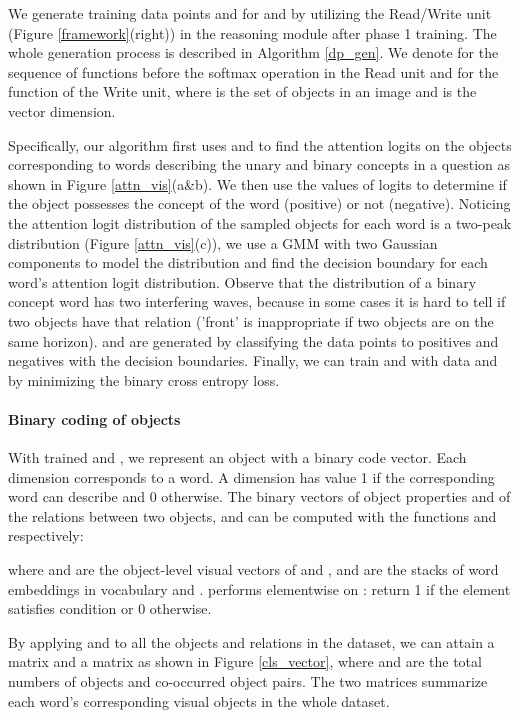 \documentclass[10pt,twocolumn,letterpaper]{article}
\begin{document}
We generate training data points  and  for  and  by utilizing the Read/Write unit (Figure \ref{framework}(right)) in the reasoning module after phase 1 training.
The whole generation process is described in Algorithm \ref{dp_gen}.
We denote  for the sequence of functions before the softmax operation in the Read unit and  for the function of the Write unit, where  is the set of objects in an image and  is the vector dimension.

Specifically, our algorithm first uses  and  to find the attention logits on the objects corresponding to words describing the unary and binary concepts in a question as shown in Figure \ref{attn_vis}(a\&b). 
We then use the values of logits to determine if the object possesses the concept of the word (positive) or not (negative).
Noticing the attention logit distribution of the sampled objects for each word is a two-peak distribution (Figure \ref{attn_vis}(c)), we use a GMM \cite{xuan2001algorithms} with two Gaussian components to model the distribution and find the decision boundary for each word's attention logit distribution. Observe that the distribution of a binary concept word has two interfering waves, because in some cases it is hard to tell if two objects have that relation ('front' is inappropriate if two objects are on the same horizon).
 and  are generated by classifying the data points to positives and negatives with the decision boundaries. 
Finally, we can train  and  with data  and  by minimizing the binary cross entropy loss.




\vspace{-5mm}
\paragraph{Binary coding of objects}
With trained  and , we represent an object  with a binary code vector. Each dimension corresponds to a word. A dimension has value 1 if the corresponding word can describe  and 0 otherwise. The binary vectors of object properties and of the relations between two objects,  and  can be computed with the functions  and  respectively:
\vspace{-2mm}

where  and  are the object-level visual vectors of  and ,  and  are the stacks of word embeddings in vocabulary  and .  performs elementwise on : return 1 if the element satisfies condition  or 0 otherwise. 

By applying  and  to all the objects and relations in the dataset, we can attain a matrix  and a matrix  as shown in Figure \ref{cls_vector}, where  and  are the total numbers of objects and co-occurred object pairs. The two matrices summarize each word's corresponding visual objects in the whole dataset.
\end{document}
